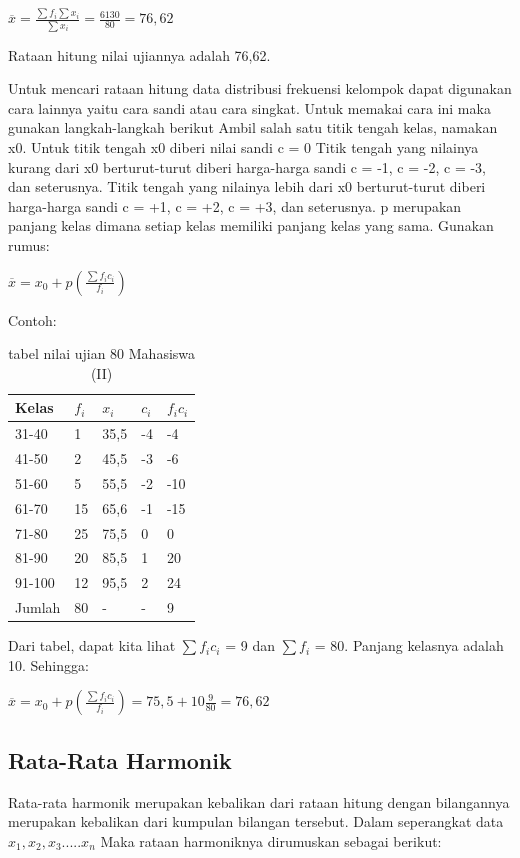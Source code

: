 \documentclass[11pt,fleqn]{book} %
\begin{document}
{$ \overline{x} = \frac{\sum f_{i}\sum x_{i}}{\sum x_{i}} = \frac{6130}{80} = 76,62 $

Rataan hitung nilai ujiannya adalah 76,62.

Untuk mencari rataan hitung data distribusi frekuensi kelompok dapat digunakan cara lainnya yaitu cara sandi atau cara singkat. Untuk memakai cara ini maka gunakan langkah-langkah berikut
	Ambil salah satu titik tengah kelas, namakan x0.
	Untuk titik tengah x0 diberi nilai sandi c = 0
	Titik tengah yang nilainya kurang dari x0 berturut-turut diberi harga-harga sandi c = -1, c = -2, c = -3, dan seterusnya.
	Titik tengah yang nilainya lebih dari x0 berturut-turut diberi harga-harga sandi c = +1, c = +2, c = +3, dan seterusnya.
	p merupakan panjang kelas dimana setiap kelas memiliki panjang kelas yang sama.
Gunakan rumus:

$\overline{x} = x_{0} + p(\frac{\sum f_{i}c_{i}}{f_{i}})$


Contoh: 

\begin{table}[h]
\centering
\begin{tabular}{l l l l l}
\toprule
\textbf{Kelas} & \textbf{$f_{i}$} & \textbf{$x_{i}$} & \textbf{$c_{i}$} & \textbf{$f_{i}c_{i}$}\\
\midrule
31-40 & 1 & 35,5 & -4 & -4\\
41-50 & 2 & 45,5 & -3 & -6\\
51-60 & 5 & 55,5 & -2 & -10\\
61-70 & 15 & 65,6 & -1 & -15\\
71-80 & 25 & 75,5 & 0 & 0\\
81-90 & 20 & 85,5 & 1 & 20\\
91-100 & 12 & 95,5 & 2 & 24\\
Jumlah & 80 & - & - & 9 \\ 
\bottomrule
\end{tabular}
\caption{tabel nilai ujian 80 Mahasiswa (II)}
\end{table}

Dari tabel, dapat kita lihat $\sum f_{i}c_{i}$  = 9 dan $\sum f_{i}$  = 80. Panjang kelasnya adalah 10. Sehingga:

$\overline{x} = x_{0} + p(\frac{\sum f_{i}c_{i}}{f_{i}}) = 75,5 + 10\frac{9}{80} = 76,62 $

\subsection{Rata-Rata Harmonik}

Rata-rata harmonik merupakan kebalikan dari rataan hitung dengan bilangannya merupakan kebalikan dari kumpulan bilangan tersebut. Dalam seperangkat data
$ x_{1},x_{2},x_{3}.....x_{n} $ Maka rataan harmoniknya dirumuskan sebagai berikut:

}
\end{document}
